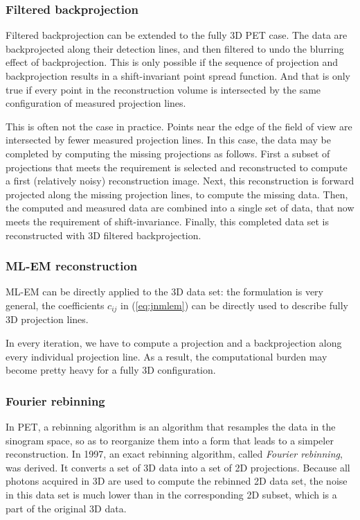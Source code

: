 \subsubsection{Filtered backprojection}
Filtered backprojection can be extended to the fully 3D PET case. The data are
backprojected along their detection lines, and then filtered to undo the
blurring effect of backprojection. This is only possible if the sequence of
projection and backprojection results in a shift-invariant point spread
function. And that is only true if every point in the reconstruction volume is
intersected by the same configuration of measured projection lines.

This is often not the case in practice. Points near the edge of the field of
view are intersected by fewer measured projection lines. In this case, the
data may be completed by computing the missing projections as follows. First a
subset of projections that meets the requirement is selected and reconstructed
to compute a first (relatively noisy) reconstruction image. Next, this
reconstruction is forward projected along the missing projection lines, to
compute the missing data. Then, the computed and measured data are combined
into a single set of data, that now meets the requirement of shift-invariance.
Finally, this completed data set is reconstructed with 3D filtered
backprojection.

\subsubsection{ML-EM reconstruction}
ML-EM can be directly applied to the 3D data set: the formulation is very
general, the coefficients $c_{ij}$ in (\ref{eq:jnmlem}) can be directly used
to describe fully 3D projection lines.

In every iteration, we have to compute a projection and a backprojection along
every individual projection line. As a result, the computational burden may
become pretty heavy for a fully 3D configuration.


\subsubsection{Fourier rebinning}
In PET, a rebinning algorithm is an algorithm that resamples the data
in the sinogram space, so as to reorganize them into a form that
leads to a simpeler reconstruction.
%
In 1997, an exact rebinning algorithm, called {\em Fourier rebinning},
was derived. It converts a set of 3D data into a set of 2D
projections. Because all photons acquired in 3D are used to compute
the rebinned 2D data set, the noise in this data set is much lower
than in the corresponding 2D subset, which is a part of the original
3D data.

